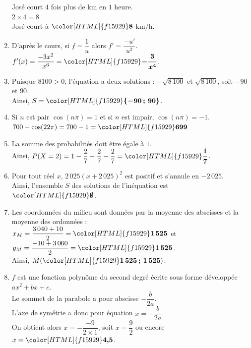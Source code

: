 \documentclass[a4paper,11pt,landscape,exos]{nsi} %
\begin{document}
\begin{multicols}{2}
\begin{enumerate}[]
    José court $4$ fois plus de km en $1$ heure.\\
   $2\times 4=8$\\
   José court à ${\color[HTML]{f15929}\boldsymbol{8}}$ km/h.
\item D'après le cours, si $f=\dfrac{1}{u}$ alors $f'=\dfrac{-u'}{u^2}$.\\
    $f'(x)=\dfrac{-3x^{2}}{x^{6}}={\color[HTML]{f15929}\boldsymbol{-\dfrac{3}{x^{4}}}}$.
\item Puisque $8100>0$, l'équation a deux solutions :  $-\sqrt{8\,100}$ et $\sqrt{8\,100}$, soit $-90$ et $90$.\\
    Ainsi, $S={\color[HTML]{f15929}\boldsymbol{\{-90\,;\,90\}}}$.
\item Si $n$ est pair $\cos(n\pi)=1$ et si $n$ est impair, $\cos(n\pi)=-1$.\\$700 - \cos(22\pi)=700 - 1={\color[HTML]{f15929}\boldsymbol{699}}$
\item  La somme des probabilités doit être égale à $1$.\\
    Ainsi, $P(X=2)=1-\dfrac{2}{7}-\dfrac{2}{7}-\dfrac{2}{7}={\color[HTML]{f15929}\boldsymbol{\dfrac{1}{7}}}$.
\item Pour tout réel $x$, $2\,025(x+2\,025)^2$ est positif et s'annule en $-2\,025$.\\
               Ainsi, l'ensemble $S$ des solutions de l'inéquation est  ${\color[HTML]{f15929}\boldsymbol{\emptyset}}$.
\item Les coordonnées du milieu sont données par la moyenne des abscisses et la moyenne des ordonnées : \\
         $x_M=\dfrac{3\,040+10}{2}={\color[HTML]{f15929}\boldsymbol{1\,525}}$ et $y_M=\dfrac{-10+3\,060}{2}={\color[HTML]{f15929}\boldsymbol{1\,525}}$.\\
         Ainsi,  $M({\color[HTML]{f15929}\boldsymbol{1\,525\,;\,1\,525}})$.
\item $f$ est une fonction polynôme du second degré écrite sous forme développée $ax^2+bx+c$.\\
       Le sommet de la parabole a pour abscisse $-\dfrac{b}{2a}$.\\
           L'axe de symétrie a donc pour équation $x=-\dfrac{b}{2a}$. \\
       On obtient alors  $x=-\dfrac{-9}{2\times 1}$, soit $x=\dfrac{9}{2}$ ou encore  $x={\color[HTML]{f15929}\boldsymbol{4{,}5}}$.
   
      \vfill\null
      \columnbreak
\end{enumerate}
$\quad$\\
\end{multicols}
\end{document}
